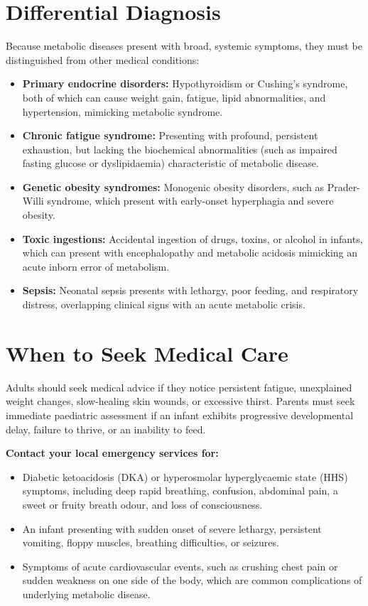\section*{Differential Diagnosis}
Because metabolic diseases present with broad, systemic symptoms, they must be distinguished from other medical conditions:
\begin{itemize}
    \item \textbf{Primary endocrine disorders:} Hypothyroidism or Cushing's syndrome, both of which can cause weight gain, fatigue, lipid abnormalities, and hypertension, mimicking metabolic syndrome.
    \item \textbf{Chronic fatigue syndrome:} Presenting with profound, persistent exhaustion, but lacking the biochemical abnormalities (such as impaired fasting glucose or dyslipidaemia) characteristic of metabolic disease.
    \item \textbf{Genetic obesity syndromes:} Monogenic obesity disorders, such as Prader-Willi syndrome, which present with early-onset hyperphagia and severe obesity.
    \item \textbf{Toxic ingestions:} Accidental ingestion of drugs, toxins, or alcohol in infants, which can present with encephalopathy and metabolic acidosis mimicking an acute inborn error of metabolism.
    \item \textbf{Sepsis:} Neonatal sepsis presents with lethargy, poor feeding, and respiratory distress, overlapping clinical signs with an acute metabolic crisis.
\end{itemize}

\section*{When to Seek Medical Care}
Adults should seek medical advice if they notice persistent fatigue, unexplained weight changes, slow-healing skin wounds, or excessive thirst. Parents must seek immediate paediatric assessment if an infant exhibits progressive developmental delay, failure to thrive, or an inability to feed.

\textbf{Contact your local emergency services for:}
\begin{itemize}
    \item Diabetic ketoacidosis (DKA) or hyperosmolar hyperglycaemic state (HHS) symptoms, including deep rapid breathing, confusion, abdominal pain, a sweet or fruity breath odour, and loss of consciousness.
    \item An infant presenting with sudden onset of severe lethargy, persistent vomiting, floppy muscles, breathing difficulties, or seizures.
    \item Symptoms of acute cardiovascular events, such as crushing chest pain or sudden weakness on one side of the body, which are common complications of underlying metabolic disease.
\end{itemize}

